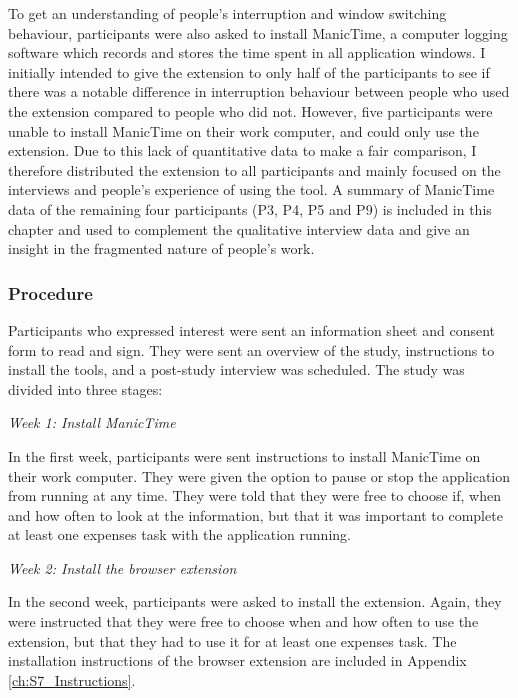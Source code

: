 To get an understanding of people’s interruption and window switching behaviour, participants were also asked to install ManicTime, a computer logging software which records and stores the time spent in all application windows. I initially intended to give the extension to only half of the participants to see if there was a notable difference in interruption behaviour between people who used the extension compared to people who did not. However, five participants were unable to install ManicTime on their work computer, and could only use the extension. Due to this lack of quantitative data to make a fair comparison, I therefore distributed the extension to all participants and mainly focused on the interviews and people’s experience of using the tool. A summary of ManicTime data of the remaining four participants (P3, P4, P5 and P9) is included in this chapter and used to complement the qualitative interview data and give an insight in the fragmented nature of people’s work.

\subsubsection{Procedure}
Participants who expressed interest were sent an information sheet and consent form to read and sign. They were sent an overview of the study, instructions to install the tools, and a post-study interview was scheduled.
The study was divided into three stages:

\textit{Week 1: Install ManicTime}

In the first week, participants were sent instructions to install ManicTime on their work computer. They were given the option to pause or stop the application from running at any time. They were told that they were free to choose if, when and how often to look at the information, but that it was important to complete at least one expenses task with the application running. 

\textit{Week 2: Install the browser extension}

In the second week, participants were asked to install the extension. Again, they were instructed that they were free to choose when and how often to use the extension, but that they had to use it for at least one expenses task. The installation instructions of the browser extension are included in Appendix \ref{ch:S7_Instructions}.


